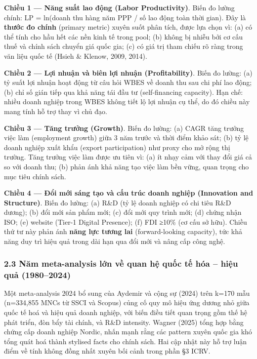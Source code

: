 \documentclass[12pt,a4paper]{article}
\begin{document}
\textbf{Chiều 1 --- Năng suất lao động (Labor Productivity)}. Biến đo
lường chính: LP = ln(doanh thu hàng năm PPP / số lao động toàn thời
gian). Đây là \textbf{thước đo chính} (primary metric) xuyên suốt phân
tích, được lựa chọn vì: (a) có thể tính cho hầu hết các nền kinh tế
trong pool; (b) không bị nhiễu bởi cơ cấu thuế và chính sách chuyển giá
quốc gia; (c) có giá trị tham chiếu rõ ràng trong văn liệu quốc tế
(Hsieh \& Klenow, 2009, 2014).

\textbf{Chiều 2 --- Lợi nhuận và biên lợi nhuận (Profitability)}. Biến
đo lường: (a) tỷ suất lợi nhuận hoạt động từ câu hỏi WBES về doanh thu
sau chi phí lao động; (b) chỉ số gián tiếp qua khả năng tái đầu tư
(self-financing capacity). Hạn chế: nhiều doanh nghiệp trong WBES không
tiết lộ lợi nhuận cụ thể, do đó chiều này mang tính hỗ trợ thay vì chủ
đạo.

\textbf{Chiều 3 --- Tăng trưởng (Growth)}. Biến đo lường: (a) CAGR tăng
trưởng việc làm (employment growth) giữa 3 năm trước và thời điểm khảo
sát; (b) tỷ lệ doanh nghiệp xuất khẩu (export participation) như proxy
cho mở rộng thị trường. Tăng trưởng việc làm được ưu tiên vì: (a) ít
nhạy cảm với thay đổi giá cả so với doanh thu; (b) phản ánh khả năng tạo
việc làm bền vững, quan trọng cho mục tiêu chính sách.

\textbf{Chiều 4 --- Đổi mới sáng tạo và cấu trúc doanh nghiệp
(Innovation and Structure)}. Biến đo lường: (a) R\&D (tỷ lệ doanh nghiệp
có chi tiêu R\&D dương); (b) đổi mới sản phẩm mới; (c) đổi mới quy trình
mới; (d) chứng nhận ISO; (e) website (Tier-1 Digital Presence); (f) FDI
≥10\% (cơ cấu sở hữu). Chiều thứ tư này phản ánh \textbf{năng lực tương
lai} (forward-looking capacity), tức khả năng duy trì hiệu quả trong dài
hạn qua đổi mới và nâng cấp công nghệ.

\hypertarget{23-nux103m-meta-analysis-lux1edbn-vux1ec1-quan-hux1ec7-quux1ed1c-tux1ebf-huxf3a--hiux1ec7u-quux1ea3-19802024}{%
\subsubsection{2.3 Năm meta-analysis lớn về quan hệ quốc tế hóa -- hiệu
quả
(1980--2024)}\label{23-nux103m-meta-analysis-lux1edbn-vux1ec1-quan-hux1ec7-quux1ed1c-tux1ebf-huxf3a--hiux1ec7u-quux1ea3-19802024}}

Một meta-analysis 2024 bổ sung của Aydemir và cộng sự (2024) trên k=170
mẫu (n=334,855 MNCs từ SSCI và Scopus) củng cố quy mô hiệu ứng dương nhỏ
giữa quốc tế hoá và hiệu quả doanh nghiệp, với biến điều tiết quan trọng
gồm thế hệ phát triển, đòn bẩy tài chính, và R\&D intensity. Wagner
(2025) tổng hợp bằng chứng cấp doanh nghiệp Nordic, nhấn mạnh rằng các
pattern xuyên quốc gia khó tổng quát hoá thành stylised facts cho chính
sách. Hai cập nhật này hỗ trợ luận điểm về tính không đồng nhất xuyên
bối cảnh trong phần §3 ICRV.
\end{document}

